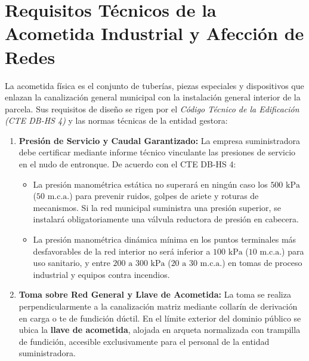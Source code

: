 \documentclass{report}
\begin{document}
\section{Requisitos Técnicos de la Acometida Industrial y Afección de Redes}

La acometida física es el conjunto de tuberías, piezas especiales y dispositivos que enlazan la canalización general municipal con la instalación general interior de la parcela. Sus requisitos de diseño se rigen por el \textit{Código Técnico de la Edificación (CTE DB-HS 4)} y las normas técnicas de la entidad gestora:

\begin{enumerate}
    \item \textbf{Presión de Servicio y Caudal Garantizado:}
          La empresa suministradora debe certificar mediante informe técnico vinculante las presiones de servicio en el nudo de entronque. De acuerdo con el CTE DB-HS 4:
          \begin{itemize}
              \item La presión manométrica estática no superará en ningún caso los $500\text{ kPa}$ ($50\text{ m.c.a.}$) para prevenir ruidos, golpes de ariete y roturas de mecanismos. Si la red municipal suministra una presión superior, se instalará obligatoriamente una válvula reductora de presión en cabecera.
              \item La presión manométrica dinámica mínima en los puntos terminales más desfavorables de la red interior no será inferior a $100\text{ kPa}$ ($10\text{ m.c.a.}$) para uso sanitario, y entre $200\text{ a }300\text{ kPa}$ ($20\text{ a }30\text{ m.c.a.}$) en tomas de proceso industrial y equipos contra incendios.
          \end{itemize}

    \item \textbf{Toma sobre Red General y Llave de Acometida:}
          La toma se realiza perpendicularmente a la canalización matriz mediante collarín de derivación en carga o te de fundición dúctil. En el límite exterior del dominio público se ubica la \textbf{llave de acometida}, alojada en arqueta normalizada con trampilla de fundición, accesible exclusivamente para el personal de la entidad suministradora.


\end{enumerate}
\end{document}
